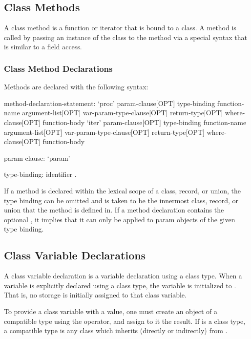 \subsection{Class Methods}
\label{Class_Methods}

A class method is a function or iterator that is bound to a class.  A method
is called by passing an instance of the class to the method via a
special syntax that is similar to a field access.

\subsubsection{Class Method Declarations}
\label{Class_Method_Declarations}

Methods are declared with the following syntax:
\begin{syntax}
method-declaration-statement:
  `proc' param-clause[OPT] type-binding function-name argument-list[OPT] var-param-type-clause[OPT]
    return-type[OPT] where-clause[OPT] function-body
  `iter' param-clause[OPT] type-binding function-name argument-list[OPT] var-param-type-clause[OPT]
    return-type[OPT] where-clause[OPT] function-body

param-clause:
  `param'

type-binding:
  identifier .
\end{syntax}
If a method is declared within the lexical scope of a class, record,
or union, the type binding can be omitted and is taken to be the
innermost class, record, or union that the method is defined in.  If a
method declaration contains the optional , it
implies that it can only be applied to param objects of the given type
binding.

\subsection{Class Variable Declarations}
\label{Class_Variable_Declarations}

A class variable declaration is a variable declaration using a class type.  When
a variable is explicitly declared using a class type, the variable is
initialized to .  That is, no storage is initially assigned to that class
variable.  

To provide a class variable with a value, one must create an object
of a compatible type using the  operator, and assign to it the result.
If  is a class type, a compatible type is any class which inherits
(directly or indirectly) from .

